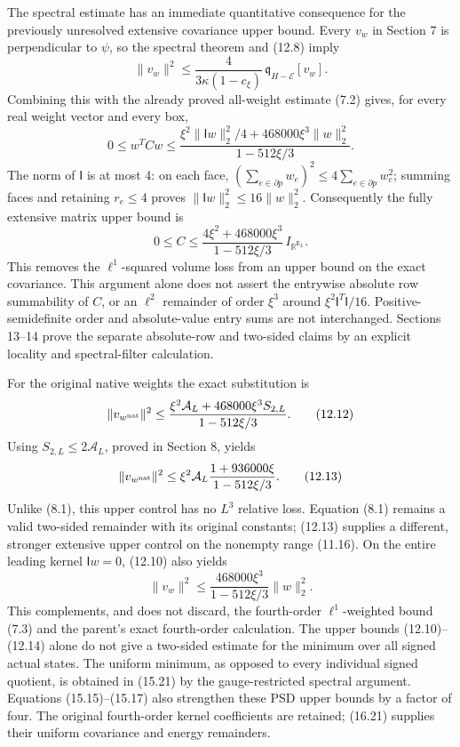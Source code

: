 \documentclass[
]{article}
\begin{document}
The spectral estimate has an immediate quantitative consequence for the
previously unresolved extensive covariance upper bound. Every \(v_w\) in
Section 7 is perpendicular to \(\psi\), so the spectral theorem and
(12.8) imply \[
\|v_w\|^2\le
\frac{4}{3\kappa(1-c_\xi)}\,\mathfrak q_{H-\mathcal E}[v_w].
\] Combining this with the already proved all-weight estimate (7.2)
gives, for every real weight vector and every box, \[
0\le w^TCw\le
\frac{\xi^2\|\mathsf Iw\|_2^2/4
             +468000\xi^3\|w\|_2^2}{1-512\xi/3}.
                                                               \tag{12.10}
\] The norm of \(\mathsf I\) is at most 4: on each face,
\((\sum_{e\in\partial p}w_e)^2\le4\sum_{e\in\partial p}w_e^2\); summing
faces and retaining \(r_e\le4\) proves
\(\|\mathsf Iw\|_2^2\le16\|w\|_2^2\). Consequently the fully extensive
matrix upper bound is \[
0\le C\le
\frac{4\xi^2+468000\xi^3}{1-512\xi/3}\,I_{\mathbb R^{\mathsf E_L}}.
                                                               \tag{12.11}
\] This removes the \(\ell^1\)-squared volume loss from an upper bound
on the exact covariance. This argument alone does not assert the
entrywise absolute row summability of \(C\), or an \(\ell^2\) remainder
of order \(\xi^3\) around \(\xi^2\mathsf I^T\mathsf I/16\).
Positive-semidefinite order and absolute-value entry sums are not
interchanged. Sections 13--14 prove the separate absolute-row and
two-sided claims by an explicit locality and spectral-filter
calculation.

For the original native weights the exact substitution is \[
\|v_{w^{\rm nat}}\|^2\le
\frac{\xi^2\mathcal A_L+468000\xi^3S_{2,L}}{1-512\xi/3}.
                                                               \tag{12.12}
\] Using \(S_{2,L}\le2\mathcal A_L\), proved in Section 8, yields \[
\|v_{w^{\rm nat}}\|^2\le
\xi^2\mathcal A_L
\frac{1+936000\xi}{1-512\xi/3}.
                                                               \tag{12.13}
\] Unlike (8.1), this upper control has no \(L^3\) relative loss.
Equation (8.1) remains a valid two-sided remainder with its original
constants; (12.13) supplies a different, stronger extensive upper
control on the nonempty range (11.16). On the entire leading kernel
\(\mathsf Iw=0\), (12.10) also yields \[
\|v_w\|^2\le\frac{468000\xi^3}{1-512\xi/3}\|w\|_2^2.
                                                               \tag{12.14}
\] This complements, and does not discard, the fourth-order
\(\ell^1\)-weighted bound (7.3) and the parent's exact fourth-order
calculation. The upper bounds (12.10)--(12.14) alone do not give a
two-sided estimate for the minimum over all signed actual states. The
uniform minimum, as opposed to every individual signed quotient, is
obtained in (15.21) by the gauge-restricted spectral argument. Equations
(15.15)--(15.17) also strengthen these PSD upper bounds by a factor of
four. The original fourth-order kernel coefficients are retained;
(16.21) supplies their uniform covariance and energy remainders.
\end{document}
